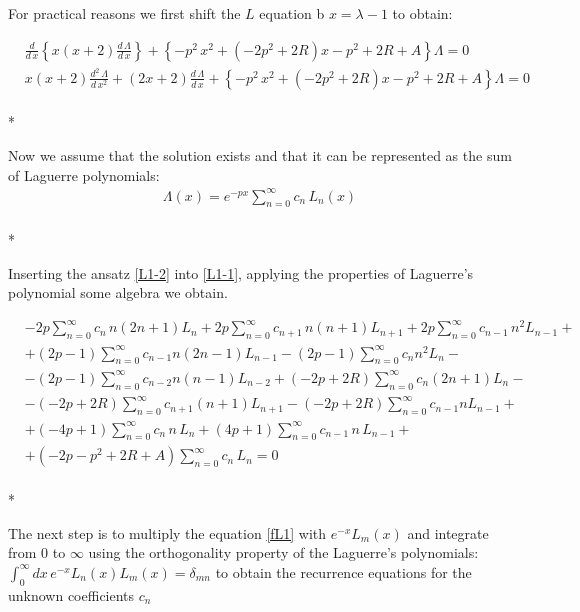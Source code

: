 For practical reasons we first shift the $ L $ equation b $ x = \lambda - 1 $ to obtain:

\begin{equation}\label{L1-1}
\begin{split}
& \frac{d}{d\,x}\left\{x(x+2)\frac{d\,\Lambda}{d\,x} \right\} + \left\{ - p^2\,x^2 + (-2p^2 + 2R) x  -p^2 + 2R + A \right\}\Lambda = 0 \\[.8em]
& x(x+2)\frac{d^2\,\Lambda}{d\,x^2} + (2x+2)\frac{d\,\Lambda}{d\,x} +  \left\{ - p^2\,x^2 + (-2p^2 + 2R) x  -p^2 + 2R + A \right\}\Lambda = 0
\end{split}
\end{equation}\\*

Now we assume that  the solution exists and that it can be represented as the sum of Laguerre polynomials:
\begin{equation}\label{L1-2}
\begin{split}
\Lambda(x) = e^{-px}\sum_{n=0}^{\infty}{c_n\,L_n(x)}
\end{split}
\end{equation}\\*

Inserting the ansatz \eqref{L1-2} into \eqref{L1-1}, applying the properties of Laguerre's polynomial some algebra we obtain. 

\begin{equation}\label{fL1}
\begin{split}
& -2p\sum_{n=0}^{\infty}{c_n\,n(2n+1)L_n}  + 2p\sum_{n=0}^{\infty}{c_{n+1}\,n(n+1)L_{n+1}}+2p\sum_{n=0}^{\infty}{c_{n-1}\,n^2L_{n-1}} + \\[.8em] 
& + (2p-1)\sum_{n=0}^{\infty}{c_{n-1}n(2n-1)L_{n-1}} - (2p-1)\sum_{n=0}^{\infty}{c_{n}n^2L_n}- \\[.8em]
& - (2p-1)\sum_{n=0}^{\infty}{c_{n-2}n(n-1)L_{n-2}} + (-2p+2R)\sum_{n=0}^{\infty}{c_n(2n+1)L_n} -  \\[.8em]
& - (-2p+2R)\sum_{n=0}^{\infty}{c_{n+1}(n+1)L_{n+1}} - (-2p+2R)\sum_{n=0}^{\infty}{c_{n-1}n L_{n-1}} + \\[.8em] 
& + (-4p + 1)\sum_{n=0}^{\infty}{c_n\,n\,L_n } + (4p+1)\sum_{n=0}^{\infty}{c_{n-1}\,n\,L_{n-1}}  +  \\[.8em]
& + (-2p - p^2 + 2R + A)\sum_{n=0}^{\infty}{c_n\,L_ n} = 0 
\end{split} 
\end{equation}\\*

The next step is to multiply the equation \eqref{fL1} with $ e^{-x}L_m(x) $ and integrate from $ 0 $ to $ \infty $ using the orthogonality property of the Laguerre's polynomials: $ \int_0^{\infty}{dx\,e^{-x}L_n(x)L_m(x)} = \delta_{mn} $ to obtain the recurrence equations for the unknown coefficients $ c_n $

